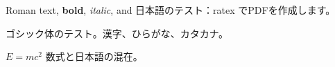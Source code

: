 \documentclass{article}
\begin{document}
Roman text, \textbf{bold}, \textit{italic}, and 日本語のテスト：ratex でPDFを作成します。

{\sffamily ゴシック体のテスト。漢字、ひらがな、カタカナ。}

$E=mc^2$ 数式と日本語の混在。
\end{document}
